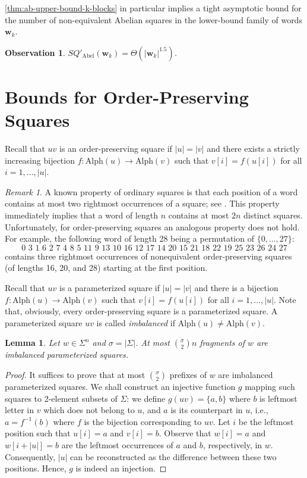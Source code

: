 \documentclass{article}
\theoremstyle{plain}
\newtheorem{lemma}[theorem]{Lemma}
\newtheorem{observation}[theorem]{Observation}
\theoremstyle{definition}
\theoremstyle{remark}
\newtheorem{remark}[theorem]{Remark}
\newcommand{\ww}{\mathbf{w}}
\newcommand{\SQ}{\mathit{SQ}}
\renewcommand{\Alph}{\mathrm{Alph}}
\newcommand{\SQPABEL}{\SQ'_{\mathrm{Abel}}}
\begin{document}
  \cref{thm:ab-upper-bound-k-blocks} in particular implies a tight asymptotic bound for the
  number of non-equivalent Abelian squares in the lower-bound family of words $\ww_k$.
  \begin{observation}
    $\SQPABEL(\ww_k) = \Theta(|\ww_k|^{1.5})$.
  \end{observation}

  \section{Bounds for Order-Preserving Squares}\label{sec:op}
  Recall that $uv$ is an order-preserving square if $|u|=|v|$ and there exists a strictly increasing
  bijection $f : \Alph(u) \to \Alph(v)$ such that $v[i]=f(u[i])$ for all $i=1,\ldots,|u|$.

  \begin{remark}\label{rmk:op_last}
    A known property of ordinary squares is that each position of a word contains at most
    two rightmost occurrences of a square; see \cite{fraenkel-simpson}.
    This property immediately implies that a word of length $n$ contains at most $2n$ distinct squares.
    Unfortunately, for order-preserving squares an analogous property does not hold.
    For example, the following word of length 28 being a permutation of $\{0,\ldots,27\}$:
    \[0\,\, 3\,\, 1\,\, 6\,\, 2\,\, 7\,\, 4\,\, 8\,\, 5\,\, 11\,\, 9\,\, 13\,\, 10\,\, 16\,\, 12\,\, 17\,\, 14\,\, 20\,\, 15\,\, 21\,\, 18\,\, 22\,\, 19\,\, 25\,\, 23\,\, 26\,\, 24\,\, 27\]
    contains three rightmost occurrences of nonequivalent order-preserving squares (of lengths 16, 20, and 28) starting at the first position.
  \end{remark}
  
  Recall that $uv$ is a parameterized square
  if $|u|=|v|$ and there is a bijection $f: \Alph(u)\to \Alph(v)$ such that
  $v[i]=f(u[i])$ for all $i=1,\ldots,|u|$.
  Note that, obviously, every order-preserving square is a parameterized square.
  A parameterized square $uv$ is called \emph{imbalanced} if $\Alph(u) \ne \Alph(v)$.

  \begin{lemma}\label{lem:imbalanced}
  Let $w\in \Sigma^n$ and $\sigma=|\Sigma|$.
  At most $\binom{\sigma}{2} n$ fragments of $w$ are imbalanced parameterized squares.
  \end{lemma}
  \begin{proof}
    It suffices to prove that at most $\binom{\sigma}{2}$ prefixes of $w$ are imbalanced parameterized squares.
  We shall construct an injective function $g$ mapping such squares to 2-element subsets of $\Sigma$:
  we define $g(uv)=\{a,b\}$ where $b$ is leftmost letter in $v$ which does not belong to $u$, and $a$ is its counterpart in $u$,
  i.e., $a=f^{-1}(b)$ where $f$ is the bijection corresponding to $uv$.
  Let $i$ be the leftmost position such that $u[i]=a$ and $v[i]=b$.
  Observe that $w[i]=a$ and $w[i+|u|]=b$
  are the leftmost occurrences of $a$ and $b$, respectively, in $w$. Consequently, $|u|$ can be reconstructed
  as the difference between these two positions. Hence, $g$ is indeed an injection.
  \end{proof}
  
\end{document}
